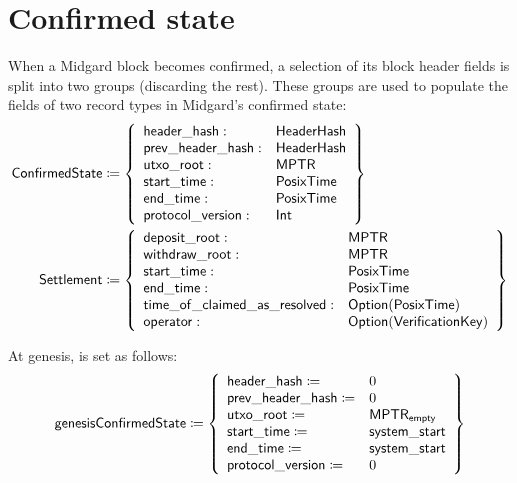 \documentclass[../midgard.tex]{subfiles}
\begin{document}
\section{Confirmed state}
\label{h:confirmed-state}

When a Midgard block becomes confirmed, a selection of its block header fields is split into two groups (discarding the rest).
These groups are used to populate the fields of two record types in Midgard's confirmed state:
\begingroup
\allowdisplaybreaks
\begin{align*}
    \mathsf{ConfirmedState} &\coloneq \left\{
    \begin{array}{ll}
        \mathsf{header\_hash} : & \mathsf{HeaderHash} \\
        \mathsf{prev\_header\_hash} : & \mathsf{HeaderHash} \\
        \mathsf{utxo\_root} : & \mathsf{MPTR} \\
        \mathsf{start\_time} : & \mathsf{PosixTime} \\
        \mathsf{end\_time} : & \mathsf{PosixTime} \\
        \mathsf{protocol\_version} : & \mathsf{Int} \\
    \end{array} \right\} \\
    \mathsf{Settlement} &\coloneq \left\{
    \begin{array}{ll}
        \mathsf{deposit\_root} : & \mathsf{MPTR} \\
        \mathsf{withdraw\_root} : & \mathsf{MPTR} \\
        \mathsf{start\_time}: & \mathsf{PosixTime} \\
        \mathsf{end\_time}: & \mathsf{PosixTime} \\
        \mathsf{time\_of\_claimed\_as\_resolved}: & \mathsf{Option}(\mathsf{PosixTime}) \\
        \mathsf{operator}: & \mathsf{Option}(\mathsf{VerificationKey})
    \end{array} \right\}
\end{align*}
\endgroup

At genesis,  is set as follows:
\begin{equation*}
    \mathsf{genesisConfirmedState} \coloneq \left\{
        \begin{array}{ll}
            \mathsf{header\_hash} \coloneq & 0 \\
            \mathsf{prev\_header\_hash} \coloneq & 0 \\
            \mathsf{utxo\_root} \coloneq & \mathsf{MPTR}_{\mathsf{empty}} \\
            \mathsf{start\_time} \coloneq & \mathsf{system\_start} \\
            \mathsf{end\_time} \coloneq & \mathsf{system\_start} \\
            \mathsf{protocol\_version} \coloneq & 0
        \end{array} \right\}
\end{equation*}
\end{document}
